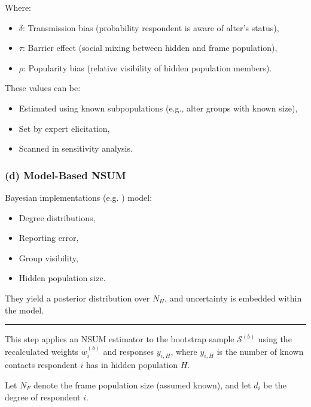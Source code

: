 \documentclass[
  12pt,
  letterpaper,
  DIV=11,
  numbers=noendperiod]{scrartcl}
\theoremstyle{plain}
\theoremstyle{definition}
\begin{document}
Where:

\begin{itemize}
\item
  \(\delta\): Transmission bias (probability respondent is aware of
  alter's status),
\item
  \(\tau\): Barrier effect (social mixing between hidden and frame
  population),
\item
  \(\rho\): Popularity bias (relative visibility of hidden population
  members).
\end{itemize}

These values can be:

\begin{itemize}
\item
  Estimated using known subpopulations (e.g., alter groups with known
  size),
\item
  Set by expert elicitation,
\item
  Scanned in sensitivity analysis.
\end{itemize}

\subsubsection{(d) Model-Based NSUM}\label{d-model-based-nsum}

Bayesian implementations (e.g. \textcite{malt15-estimating}) model:

\begin{itemize}
\item
  Degree distributions,
\item
  Reporting error,
\item
  Group visibility,
\item
  Hidden population size.
\end{itemize}

They yield a posterior distribution over \(N_H\), and uncertainty is
embedded within the model.

\begin{center}\rule{0.5\linewidth}{0.5pt}\end{center}

This step applies an NSUM estimator to the bootstrap sample
\(\mathcal{S}^{(b)}\) using the recalculated weights \(w_i^{(b)}\) and
responses \(y_{i,H}\), where \(y_{i,H}\) is the number of known contacts
respondent \(i\) has in hidden population \(H\).

Let \(N_F\) denote the frame population size (assumed known), and let
\(d_i\) be the degree of respondent \(i\).
\end{document}
